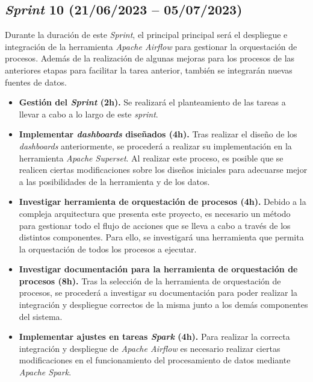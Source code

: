 \subsection{\textit{Sprint} 10 (21/06/2023 -- 05/07/2023)}

Durante la duración de este \textit{Sprint}, el principal principal será el despliegue e integración de la herramienta \textit{Apache Airflow} para gestionar la orquestación de procesos. Además de la realización de algunas mejoras para los procesos de las anteriores etapas para facilitar la tarea anterior, también se integrarán nuevas fuentes de datos.

\begin{itemize}

    \item \textbf{Gestión del \textit{Sprint} (2h).} Se realizará el planteamiento de las tareas a llevar a cabo a lo largo de este \textit{sprint}.

    \item \textbf{Implementar \textit{dashboards} diseñados (4h).} Tras realizar el diseño de los \textit{dashboards} anteriormente, se procederá a realizar su implementación en la herramienta \textit{Apache Superset}. Al realizar este proceso, es posible que se realicen ciertas modificaciones sobre los diseños iniciales para adecuarse mejor a las posibilidades de la herramienta y de los datos.

    \item \textbf{Investigar herramienta de orquestación de procesos (4h).} Debido a la compleja arquitectura que presenta este proyecto, es necesario un método para gestionar todo el flujo de acciones que se lleva a cabo a través de los distintos componentes. Para ello, se investigará una herramienta que permita la orquestación de todos los procesos a ejecutar.

    \item \textbf{Investigar documentación para la herramienta de orquestación de procesos (8h).} Tras la selección de la herramienta de orquestación de procesos, se procederá a investigar su documentación para poder realizar la integración y despliegue correctos de la misma junto a los demás componentes del sistema.
    
    \item \textbf{Implementar ajustes en tareas \textit{Spark} (4h).} Para realizar la correcta integración y despliegue de \textit{Apache Airflow} es necesario realizar ciertas modificaciones en el funcionamiento del procesamiento de datos mediante \textit{Apache Spark}.
    

\end{itemize}
